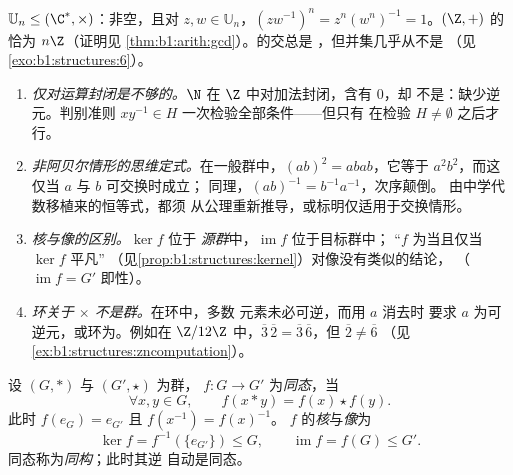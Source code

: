 \begin{example}\label{ex:b1:structures:subgroups}
$\mathbb{U}_n \leq (\C^*, \times)$：非空，且对 $z, w \in
\mathbb{U}_n$，$(zw^{-1})^n = z^n (w^n)^{-1} = 1$。$(\Z, +)$ 的
恰为 $n\Z$（证明见
\cref{thm:b1:arith:gcd}）。的交总是
，但并集几乎从不是
（见\cref{exo:b1:structures:6}）。
\end{example}

\begin{remark}[结构的常见误区]\label{rem:b1:structures:pitfalls}
\begin{enumerate}
  \item \emph{仅对运算封闭是不够的。}$\N$ 在
        $\Z$ 中对加法封闭，含有 $0$，却
        不是：缺少逆元。判别准则
        $xy^{-1} \in H$ 一次检验全部条件——但只有
        在检验 $H \neq \emptyset$ 之后才行。
  \item \emph{非阿贝尔情形的思维定式。}在一般群中，$(ab)^2 =
        abab$，它等于 $a^2b^2$，而这仅当 $a$ 与 $b$ 可交换时成立；
        同理，$(ab)^{-1} = b^{-1}a^{-1}$，次序颠倒。
        由中学代数移植来的恒等式，都须
        从公理重新推导，或标明仅适用于交换情形。
  \item \emph{核与像的区别。}$\ker f$ 位于
        \emph{源群}中，$\operatorname{im} f$ 位于目标群中；
        “$f$ 为当且仅当 $\ker f$ 平凡”
        （见\cref{prop:b1:structures:kernel}）对像没有类似的结论，
        （$\operatorname{im} f = G'$ 即性）。
  \item \emph{环关于 $\times$ 不是群。}在环中，多数
        元素未必可逆，而用 $a$ 消去时
        要求 $a$ 为可逆元，或环为。例如在 $\Z/12\Z$ 中，$\overline3\,\overline2 =
        \overline3\,\overline6$，但 $\overline2 \neq \overline6$
        （见\cref{ex:b1:structures:zncomputation}）。
\end{enumerate}
\end{remark}

\begin{definition}[群同态]\label{def:b1:structures:morphism}
设 $(G, *)$ 与 $(G', \star)$ 为群， $f \colon G \to G'$
为\emph{同态}，当
\[
\forall x, y \in G, \qquad f(x * y) = f(x) \star f(y).
\]
此时 $f(e_G) = e_{G'}$ 且 $f(x^{-1}) = f(x)^{-1}$。
$f$ 的\emph{核}与\emph{像}为
\[
\ker f = f^{-1}(\{e_{G'}\}) \leq G,
\qquad
\operatorname{im} f = f(G) \leq G' .
\]
同态称为\emph{同构}；此时其逆
自动是同态。
\end{definition}

